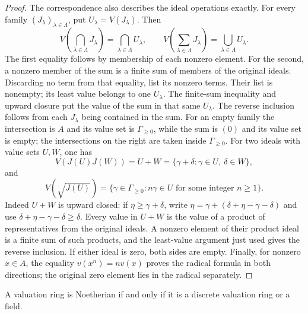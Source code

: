 \begin{proof}
The correspondence also describes the ideal operations exactly.
For every family $(J_\lambda)_{\lambda\in\Lambda}$, put
$U_\lambda=V(J_\lambda)$. Then
$$
V\left(\bigcap_{\lambda\in\Lambda}J_\lambda\right)
=\bigcap_{\lambda\in\Lambda}U_\lambda,
\qquad
V\left(\sum_{\lambda\in\Lambda}J_\lambda\right)
=\bigcup_{\lambda\in\Lambda}U_\lambda.
$$
The first equality follows by membership of each nonzero element.
For the second, a nonzero member of the sum is a finite sum of
members of the original ideals. Discarding no term from that
equality, list its nonzero terms. Their list is nonempty; its least
value belongs to one $U_\lambda$. The finite-sum inequality and
upward closure put the value of the sum in that same $U_\lambda$.
The reverse inclusion follows from each $J_\lambda$ being contained
in the sum. For an empty family the intersection is $A$ and its
value set is $\Gamma_{\geq0}$, while the sum is $(0)$ and its
value set is empty; the intersections on the right are taken
inside $\Gamma_{\geq0}$.
For two ideals with value sets $U,W$, one has
$$
V(J(U)J(W))=U+W
=\{\gamma+\delta:\gamma\in U,\ \delta\in W\},
$$
and
$$
V(\sqrt{J(U)})
=\{\gamma\in\Gamma_{\geq0}:n\gamma\in U
\text{ for some integer }n\geq1\}.
$$
Indeed $U+W$ is upward closed: if
$\eta\geq\gamma+\delta$, write
$\eta=\gamma+(\delta+\eta-\gamma-\delta)$ and use
$\delta+\eta-\gamma-\delta\geq\delta$.
Every value in $U+W$ is the value of a product of representatives
from the original ideals. A nonzero element of their product ideal
is a finite sum of such products, and the least-value argument
just used gives the reverse inclusion. If either ideal is zero,
both sides are empty. Finally, for nonzero $x\in A$, the equality
$v(x^n)=n v(x)$ proves the radical formula in both directions;
the original zero element lies in the radical separately.
\end{proof}

\begin{lemma}
\label{editorial-source-lemma-valuation-ring-Noetherian-discrete}
A valuation ring is Noetherian if and only if it is
a discrete valuation ring or a field.
\end{lemma}


